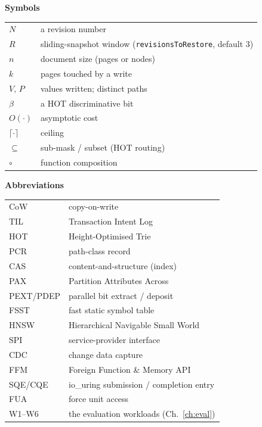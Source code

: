 \documentclass[11pt,a4paper,oneside]{report}
\theoremstyle{sirixthm}
\newcommand{\code}[1]{\texttt{#1}}
\begin{document}
\begin{minipage}[t]{0.47\linewidth}
\small
{\sffamily\bfseries\color{slate} Symbols}\par\vspace{3pt}
\begin{tabularx}{\linewidth}{@{}l >{\RaggedRight}X@{}}
\toprule
$N$ & a revision number\\
$R$ & sliding-snapshot window (\code{revisionsToRestore}, default 3)\\
$n$ & document size (pages or nodes)\\
$k$ & pages touched by a write\\
$V,\,P$ & values written; distinct paths\\
$\beta$ & a HOT discriminative bit\\
$O(\cdot)$ & asymptotic cost\\
$\lceil\cdot\rceil$ & ceiling\\
$\subseteq$ & sub-mask / subset (HOT routing)\\
$\circ$ & function composition\\
\bottomrule
\end{tabularx}
\end{minipage}\hfill
\begin{minipage}[t]{0.49\linewidth}
\small
{\sffamily\bfseries\color{slate} Abbreviations}\par\vspace{3pt}
\begin{tabularx}{\linewidth}{@{}l >{\RaggedRight}X@{}}
\toprule
CoW & copy-on-write\\
TIL & Transaction Intent Log\\
HOT & Height-Optimised Trie\\
PCR & path-class record\\
CAS & content-and-structure (index)\\
PAX & Partition Attributes Across\\
PEXT/PDEP & parallel bit extract / deposit\\
FSST & fast static symbol table\\
HNSW & Hierarchical Navigable Small World\\
SPI & service-provider interface\\
CDC & change data capture\\
FFM & Foreign Function \& Memory API\\
SQE/CQE & io\_uring submission / completion entry\\
FUA & force unit access\\
W1--W6 & the evaluation workloads (Ch.~\ref{ch:eval})\\
\bottomrule
\end{tabularx}
\end{minipage}
\end{document}

